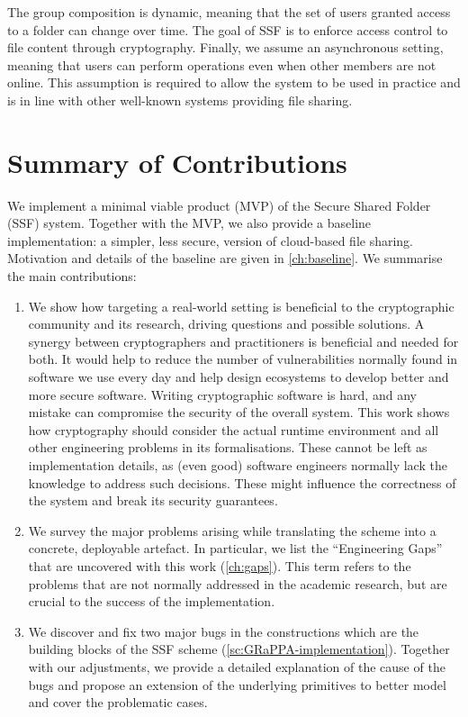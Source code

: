 The group composition is dynamic, meaning that the set of users granted access to a folder can change over time.
The goal of SSF is to enforce access control to file content through cryptography.
Finally, we assume an asynchronous setting, meaning that users can
perform operations even when other members are not online.
This assumption is required to allow the system to be used in practice
and is in line with other well-known systems providing file sharing.

\section{Summary of Contributions}\label{sc:summary-of-contributions}

We implement a minimal viable product (MVP) of the Secure Shared Folder (SSF) system.
Together with the MVP, we also provide a baseline implementation:
a simpler, less secure, version of cloud-based file sharing. Motivation
and details of the baseline are given in \cref{ch:baseline}.
We summarise the main contributions:

\begin{enumerate}
    \item We show how targeting a real-world setting is 
    beneficial to the cryptographic community and its 
    research, driving questions and possible solutions. 
    A synergy between cryptographers and practitioners 
    is beneficial and needed for both. It would help to 
    reduce the number of vulnerabilities normally found 
    in software we use every day and help design ecosystems 
    to develop better and more secure software. 
    Writing cryptographic software is hard, 
    and any mistake can compromise the security of the overall 
    system. This work shows how cryptography 
    should consider the actual runtime environment 
    and all other engineering problems in its formalisations. 
    These cannot be left as implementation details, 
    as (even good) software engineers normally lack the 
    knowledge to address such decisions. These might influence 
    the correctness of the system and break its security guarantees.
    \item We survey the major problems arising while 
    translating the scheme into a concrete, deployable 
    artefact. In particular, we list the ``Engineering Gaps''
    that are uncovered with this work (\cref{ch:gaps}). 
    This term refers to 
    the problems that are not normally addressed in the 
    academic research, but are crucial to the success of 
    the implementation.
    \item We discover and fix two major bugs in the 
    constructions which are the building blocks of 
    the SSF scheme (\cref{sc:GRaPPA-implementation}). 
    Together with our adjustments, we provide a 
    detailed explanation of the cause of the bugs and 
    propose an extension of the underlying primitives to 
    better model and cover the problematic cases.
\end{enumerate}


